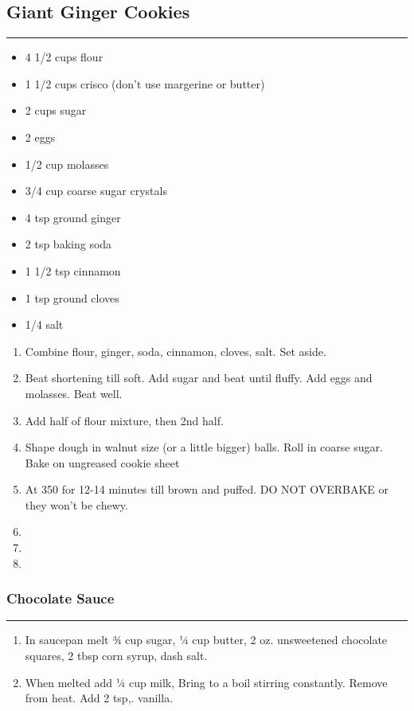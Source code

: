 \documentclass{article}
\begin{document}
\subsection{Giant Ginger Cookies} 
\noindent\rule[0.5ex]{\linewidth}{1pt}

\begin{framed}
\begin{itemize}
    \item 4 1/2 cups flour
    \item 1 1/2 cups crisco (don't use margerine or butter)
    \item 2 cups sugar
    \item 2 eggs
    \item 1/2 cup molasses
    \item 3/4 cup coarse sugar crystals
    \item 4 tsp ground ginger
    \item 2 tsp baking soda 
    \item 1 1/2 tsp cinnamon
    \item 1 tsp ground cloves
    \item 1/4 salt
\end{itemize}
\end{framed}

\begin{enumerate}
    \item
        Combine flour, ginger, soda, cinnamon, cloves, salt. Set aside.
    \item
        Beat shortening till soft. Add sugar and beat until fluffy. Add eggs and molasses. Beat well.
    \item
        Add half of flour mixture, then 2nd half.
    \item
        Shape dough in walnut size (or a little bigger) balls. Roll in coarse sugar. Bake on ungreased cookie sheet
    \item
        At 350 for 12-14 minutes till brown and puffed. DO NOT OVERBAKE or they won’t be chewy.
    \item
    \item
    \item
\end{enumerate}

\subsubsection{Chocolate Sauce} 
\noindent\rule[0.5ex]{\linewidth}{0.5pt}
\begin{enumerate}
    \item
        In saucepan melt ¾ cup sugar, ¼ cup butter, 2 oz. unsweetened chocolate squares, 2 tbsp corn syrup, dash salt.
    \item
        When melted add ¼ cup milk, Bring to a boil stirring constantly. Remove from heat. Add 2 tsp,. vanilla.
\end{enumerate}
\newpage
\end{document}
